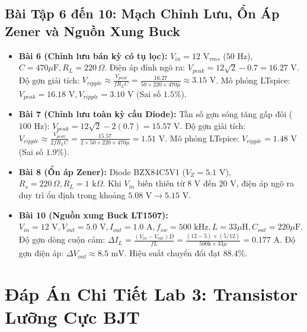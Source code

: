 \documentclass[12pt,a4paper]{report}
\begin{document}
\section{Bài Tập 6 đến 10: Mạch Chỉnh Lưu, Ổn Áp Zener và Nguồn Xung Buck}
\begin{itemize}
    \item \textbf{Bài 6 (Chỉnh lưu bán kỳ có tụ lọc):} $V_{in} = 12\text{ V}_{rms}$ ($50\text{ Hz}$), $C = 470\mu\text{F}, R_L = 220\,\Omega$. Điện áp đỉnh ngõ ra: $V_{peak} = 12\sqrt{2} - 0.7 = 16.27\text{ V}$. Độ gợn giải tích: $V_{ripple} \approx \frac{V_{peak}}{f R_L C} = \frac{16.27}{50 \times 220 \times 470\mu} \approx 3.15\text{ V}$. Mô phỏng LTspice: $V_{peak} = 16.18\text{ V}, V_{ripple} = 3.10\text{ V}$ (Sai số $1.5\%$).
    \item \textbf{Bài 7 (Chỉnh lưu toàn kỳ cầu Diode):} Tần số gợn sóng tăng gấp đôi ($100\text{ Hz}$): $V_{peak} = 12\sqrt{2} - 2(0.7) = 15.57\text{ V}$. Độ gợn giải tích: $V_{ripple} \approx \frac{V_{peak}}{2 f R_L C} = \frac{15.57}{2 \times 50 \times 220 \times 470\mu} = 1.51\text{ V}$. Mô phỏng LTspice: $V_{ripple} = 1.48\text{ V}$ (Sai số $1.9\%$).
    \item \textbf{Bài 8 (Ổn áp Zener):} Diode BZX84C5V1 ($V_Z = 5.1\text{ V}$), $R_s = 220\,\Omega, R_L = 1\text{ k}\Omega$. Khi $V_{in}$ biến thiên từ $8\text{ V}$ đến $20\text{ V}$, điện áp ngõ ra duy trì ổn định trong khoảng $5.08\text{ V} \to 5.15\text{ V}$.
    \item \textbf{Bài 10 (Nguồn xung Buck LT1507):} $V_{in} = 12\text{ V}, V_{out} = 5.0\text{ V}, I_{out} = 1.0\text{ A}, f_{sw} = 500\text{ kHz}, L = 33\mu\text{H}, C_{out} = 220\mu\text{F}$. Độ gợn dòng cuộn cảm: $\Delta I_L = \frac{(V_{in} - V_{out}) D}{f L} = \frac{(12-5) \times (5/12)}{500\text{k} \times 33\mu} = 0.177\text{ A}$. Độ gợn điện áp: $\Delta V_{out} \approx 8.5\text{ mV}$. Hiệu suất chuyển đổi đạt $88.4\%$.
\end{itemize}

\chapter{Đáp Án Chi Tiết Lab 3: Transistor Lưỡng Cực BJT}
\end{document}
